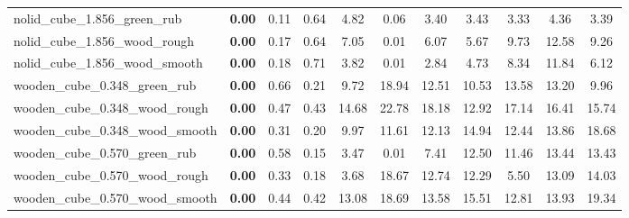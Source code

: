 \begin{table}[H]
{\begin{tabular}{l cccccccccc}
        nolid\_cube\_1.856\_green\_rub & \textbf{0.00} & 0.11 & 0.64 & 4.82 & 0.06 & 3.40 & 3.43 & 3.33 & 4.36 & 3.39 \\
        nolid\_cube\_1.856\_wood\_rough & \textbf{0.00} & 0.17 & 0.64 & 7.05 & 0.01 & 6.07 & 5.67 & 9.73 & 12.58 & 9.26 \\
        nolid\_cube\_1.856\_wood\_smooth & \textbf{0.00} & 0.18 & 0.71 & 3.82 & 0.01 & 2.84 & 4.73 & 8.34 & 11.84 & 6.12 \\
        wooden\_cube\_0.348\_green\_rub & \textbf{0.00} & 0.66 & 0.21 & 9.72 & 18.94 & 12.51 & 10.53 & 13.58 & 13.20 & 9.96 \\
        wooden\_cube\_0.348\_wood\_rough & \textbf{0.00} & 0.47 & 0.43 & 14.68 & 22.78 & 18.18 & 12.92 & 17.14 & 16.41 & 15.74 \\
        wooden\_cube\_0.348\_wood\_smooth & \textbf{0.00} & 0.31 & 0.20 & 9.97 & 11.61 & 12.13 & 14.94 & 12.44 & 13.86 & 18.68 \\
        wooden\_cube\_0.570\_green\_rub & \textbf{0.00} & 0.58 & 0.15 & 3.47 & 0.01 & 7.41 & 12.50 & 11.46 & 13.44 & 13.43 \\
        wooden\_cube\_0.570\_wood\_rough & \textbf{0.00} & 0.33 & 0.18 & 3.68 & 18.67 & 12.74 & 12.29 & 5.50 & 13.09 & 14.03 \\
        wooden\_cube\_0.570\_wood\_smooth & \textbf{0.00} & 0.44 & 0.42 & 13.08 & 18.69 & 13.58 & 15.51 & 12.81 & 13.93 & 19.34 \\
        \bottomrule
    \end{tabular}
    }
\end{table}

